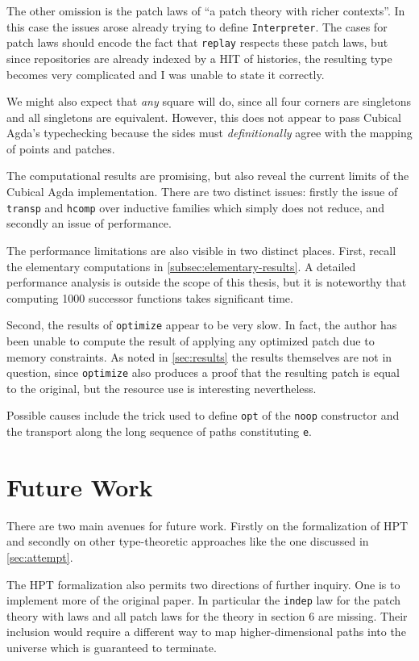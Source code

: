 The other omission is the patch laws of ``a patch theory with richer contexts''.
In this case the issues arose already trying to define \texttt{Interpreter}. The
cases for patch laws should encode the fact that \texttt{replay} respects these
patch laws, but since repositories are already indexed by a HIT of histories,
the resulting type becomes very complicated and I was unable to state it
correctly.

We might also expect that \emph{any} square will do, since all four corners are
singletons and all singletons are equivalent. However, this does not appear to
pass Cubical Agda's typechecking because the sides must \emph{definitionally}
agree with the mapping of points and patches.

The computational results are promising, but also reveal the current limits of
the Cubical Agda implementation.
There are two distinct issues: firstly the issue of \texttt{transp} and
\texttt{hcomp} over inductive families which simply does not reduce, and
secondly an issue of performance.

The performance limitations are also visible in two distinct places. First,
recall the elementary computations in \autoref{subsec:elementary-results}. A
detailed performance analysis is outside the scope of this thesis, but it is
noteworthy that computing 1000 successor functions takes significant time.

Second, the results of \texttt{optimize} appear to be very slow. In fact, the
author has been unable to compute the result of applying any optimized patch due
to memory constraints. As noted in \autoref{sec:results} the results themselves
are not in question, since \texttt{optimize} also produces a proof that the
resulting patch is equal to the original, but the resource use is interesting
nevertheless.

Possible causes include the trick used to define \texttt{opt} of the \texttt{noop}
constructor and the transport along the long sequence of paths constituting
\texttt{e}.

\section{Future Work}

There are two main avenues for future work. Firstly on the formalization of HPT
and secondly on other type-theoretic approaches like the one discussed in
\autoref{sec:attempt}.

The HPT formalization also permits two directions of further inquiry. One is to
implement more of the original paper. In particular the \texttt{indep} law for
the patch theory with laws and all patch laws for the theory in section 6 are
missing. Their inclusion would require a different way to map higher-dimensional
paths into the universe which is guaranteed to terminate.

